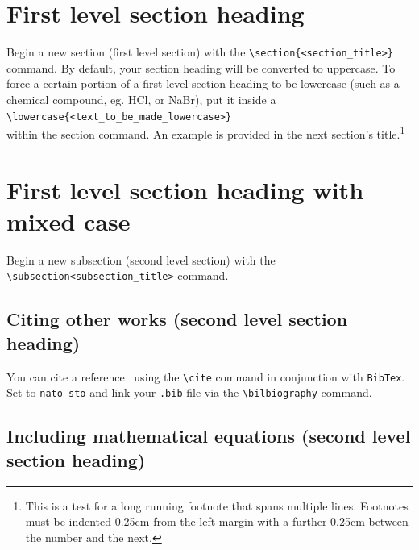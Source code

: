\documentclass{nato-sto}
\begin{document}
\section{First level section heading}	\label{sec:ref_sec1}

Begin a new section (first level section) with the \verb|\section{<section_title>}| command. By default, your section heading will be converted to uppercase. To force a certain portion of a first level section heading to be lowercase (such as a chemical compound, eg. HCl, or NaBr), put it inside a\\
\verb|\lowercase{<text_to_be_made_lowercase>}| \\
within the section command. An example is provided in the next section's title.\footnote{This is a test for a long running footnote that spans multiple lines. Footnotes must be indented 0.25cm from the left margin with a further 0.25cm between the number and the next.}

\clearpage

\section{First level section heading with mixed \lowercase{case}}

Begin a new subsection (second level section) with the \verb|\subsection<subsection_title>| command.

\subsection{Citing other works (second level section heading)}

You can cite a reference~\cite{Wu2009} using the \verb|\cite| command in conjunction with \verb|BibTex|. Set \verb|| to \verb|nato-sto| and link your \verb|.bib| file via the \verb|\bilbiography| command.

\subsection{Including mathematical equations (second level section heading)	}
\end{document}
